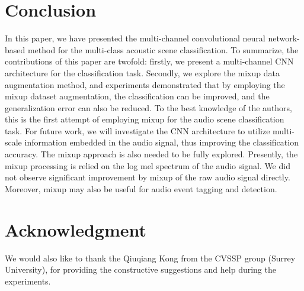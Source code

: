 \documentclass[conference]{IEEEtran}
\begin{document}
\section{Conclusion}
In this paper, we have presented the multi-channel convolutional neural network-based method for the multi-class acoustic scene classification.
To summarize, the contributions of this paper are twofold: firstly, we present a multi-channel CNN architecture for the classification task. Secondly, we explore the mixup data augmentation method, and experiments demonstrated that by employing the mixup dataset augmentation, the classification can be improved, and the generalization error can also be reduced. To the best knowledge of the authors, this is the first attempt of employing mixup for the audio scene classification task.
For future work, we will investigate the CNN architecture to utilize multi-scale information embedded in the audio signal, thus improving the classification accuracy. The mixup approach is also needed to be fully explored. Presently, the mixup processing is relied on the log mel spectrum of the audio signal. We did not observe significant  improvement by mixup of the raw audio signal directly. Moreover, mixup may also be useful for audio event tagging and detection.

\section*{Acknowledgment}

We would also like to thank the Qiuqiang Kong from the CVSSP group (Surrey University), for providing the constructive suggestions and help during the experiments.
\end{document}
